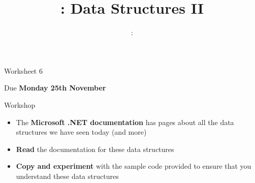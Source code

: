 \usepackage{../../beamerthemeFalmouthGamesAcademy}
\usepackage{multimedia}
\graphicspath{ {../../} }

\lstset{language=[Sharp]C
}

\usepackage[normalem]{ulem}
\usepackage{wasysym}

\usepackage{algpseudocode}

\usepackage{pdfpages}

\usetikzlibrary{arrows,automata}
\usetikzlibrary{tikzmark,calc}




\title{\sessionnumber: Data Structures II}
\subtitle{\modulecode: \moduletitle}

\frame{\titlepage} 

\begin{frame}{Worksheet 6}
    \begin{center}
        Due \textbf{Monday 25th November}
    \end{center}
\end{frame}




%

\begin{frame}{Workshop}
    \begin{itemize}
        \pause\item The \textbf{Microsoft .NET documentation} has pages about all the data structures we have seen today
            (and more)
        \pause\item \textbf{Read} the documentation for these data structures
        \pause\item \textbf{Copy and experiment} with the sample code provided to ensure that you understand
            these data structures
    \end{itemize}
\end{frame}


